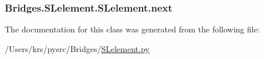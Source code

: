 \subsubsection[{next}]{\setlength{\rightskip}{0pt plus 5cm}Bridges.\+S\+Lelement.\+S\+Lelement.\+next}\label{class_bridges_1_1_s_lelement_1_1_s_lelement_a650935f5a68b49de4c222cc4c8b0c778}


The documentation for this class was generated from the following file\+:\begin{DoxyCompactItemize}
\item 
/\+Users/krs/pysrc/\+Bridges/\hyperlink{_s_lelement_8py}{S\+Lelement.\+py}\end{DoxyCompactItemize}
